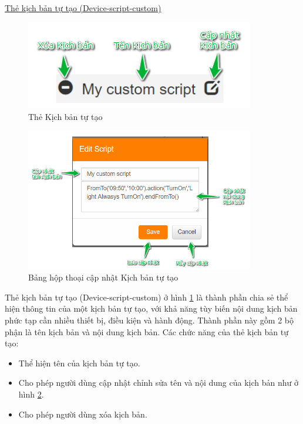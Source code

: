 \documentclass[12pt,a4paper,oneside]{extbook}
\begin{document}
\noindent
\underline{Thẻ kịch bản tự tạo (Device-script-custom)}

\begin{figure}[h]
  \centering
     \includegraphics[width=10cm]{6-DeviceScriptCustom}
  \caption{Thẻ Kịch bản tự tạo}\label{fig:6-DeviceScriptCustom}
\end{figure}

\begin{figure}[h]
  \centering
     \includegraphics[width=10cm]{6-EditCustomScript}
  \caption{Bảng hộp thoại cập nhật Kịch bản tự tạo}\label{fig:6-EditCustomScript}
\end{figure}

\noindent
Thẻ kịch bản tự tạo (Device-script-custom) ở hình \ref{fig:6-DeviceScriptCustom} là thành phần chia sẻ thể hiện thông tin của một kịch bản tự tạo, với khả năng tùy biến nội dung kịch bản phức tạp cần nhiều thiết bị, điều kiện và hành động. Thành phần này gồm 2 bộ phận là tên kịch bản và nội dung kịch bản. Các chức năng của thẻ kịch bản tự tạo:

\begin{itemize}[topsep=1mm,itemsep=-0.5mm]
\item Thể hiện tên của kịch bản tự tạo.
\item Cho phép người dùng cập nhật chỉnh sửa tên và nội dung của kịch bản như ở hình \ref{fig:6-EditCustomScript}.
\item Cho phép người dùng xóa kịch bản.
\vspace{1mm}
\end{itemize}
\end{document}
